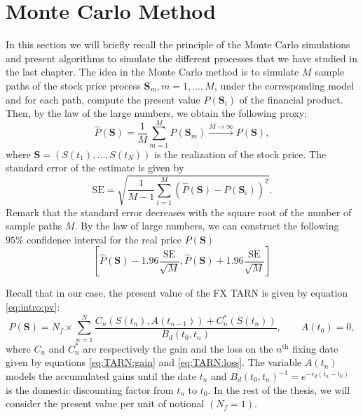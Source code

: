 \section{Monte Carlo Method }
\label{sec:methods:MC}
In this section we will briefly recall the principle of the Monte Carlo simulations and present algorithms to simulate the different processes that we have studied in the last chapter. The idea in the Monte Carlo method is to simulate $M$ sample paths of the stock price process $\mathbf{S}_m, m=1,\ldots,M$, under the corresponding model and for each path, compute the present value $P(\mathbf{S}_i)$ of the financial product. Then, by the law of the large numbers, we obtain the following proxy:
$$\hat{P}(\mathbf{S})=\frac{1}{M}\sum_{m=1}^M P(\mathbf{S}_m)\xrightarrow{M\to\infty} P(\mathbf{S}),$$
where $\mathbf{S}=(S(t_1),\ldots,S(t_N))$ is the realization of the stock price. The standard error of the estimate is given by
$$\text{SE} = \sqrt{\frac{1}{M-1}\sum_{i=1}^M \left(\hat{P}(\mathbf{S})-P(\mathbf{S}_i)\right)^2}.$$
Remark that the standard error decreases with the square root of the number of sample paths $M$. By the law of large numbers, we can construct the following $95\%$ confidence interval for the real price $P(\mathbf{S})$
$$\left[\hat{P}(\mathbf{S})-1.96\frac{\text{SE}}{\sqrt{M}},\hat{P}(\mathbf{S})+1.96\frac{\text{SE}}{\sqrt{M}} \right]$$

Recall that in our case, the present value of the FX TARN is given by equation \eqref{eq:intro:pv}:
$$P(\mathbf{S}) =N_f \times \sum_{n=1}^N\frac{C_n(S(t_n),A(t_{n-1}))+C^\ast_n(S(t_n))}{B_d(t_0,t_n)}, \qquad A(t_0)=0,$$
where $C_n$ and $C_n^\ast$ are respectively the gain and the loss on the $n^\text{th}$ fixing date given by equations \eqref{eq:TARN:gain} and \eqref{eq:TARN:loss}. The variable $A(t_n)$ models the accumulated gains until the date $t_n$ and $B_d(t_0,t_n)^{-1}=e^{-r_d(t_n-t_0)}$ is the domestic discounting factor from $t_n$ to $t_0$. In the rest of the thesis, we will consider the present value per unit of notional $(N_f=1)$.

